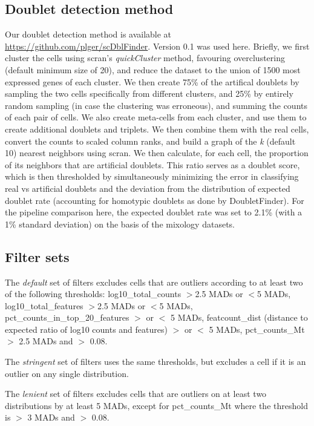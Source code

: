 \documentclass{bmcart}
\begin{document}
\subsection*{Doublet detection method}
Our doublet detection method is available at \url{https://github.com/plger/scDblFinder}. Version 0.1 was used here. Briefly, we first cluster the cells using scran's \textit{quickCluster} method, favouring overclustering (default minimum size of 20), and reduce the dataset to the union of 1500 most expressed genes of each cluster. We then create 75\% of the artifical doublets by sampling the two cells specifically from different clusters, and 25\% by entirely random sampling (in case the clustering was erroneous), and summing the counts of each pair of cells. We also create meta-cells from each cluster, and use them to create additional doublets and triplets. We then combine them with the real cells, convert the counts to scaled column ranks, and build a graph of the \textit{k} (default 10) nearest neighbors using scran. We then calculate, for each cell, the proportion of its neighbors that are artificial doublets. This ratio serves as a doublet score, which is then thresholded by simultaneously minimizing the error in classifying real vs artificial doublets and the deviation from the distribution of expected doublet rate (accounting for homotypic doublets as done by DoubletFinder). For the pipeline comparison here, the expected doublet rate was set to 2.1\% (with a 1\% standard deviation) on the basis of the mixology datasets.

\subsection*{Filter sets}
The \textit{default} set of filters excludes cells that are outliers according to at least two of the following thresholds: log10\_total\_counts $>$2.5 MADs or $<$5 MADs, log10\_total\_features $>$2.5 MADs or $<$5 MADs, pct\_counts\_in\_top\_20\_features $>$ or $<$ 5 MADs, featcount\_dist (distance to expected ratio of log10 counts and features) $>$ or $<$ 5 MADs, pct\_counts\_Mt $>$ 2.5 MADs and $>$ 0.08.

The \textit{stringent} set of filters uses the same thresholds, but excludes a cell if it is an outlier on any single distribution. 

The \textit{lenient} set of filters excludes cells that are outliers on at least two distributions by at least 5 MADs, except for pct\_counts\_Mt where the threshold is $>$ 3 MADs and $>$ 0.08.
\end{document}
